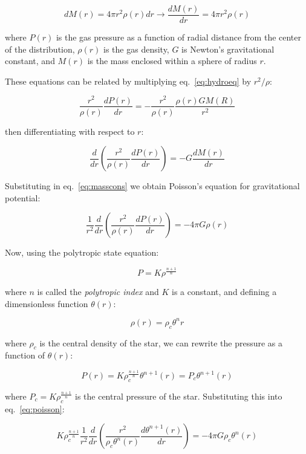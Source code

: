 \documentclass[twoside]{article}
\begin{document}
    \begin{equation}
    \label{eq:masscons}
    dM(r)=4\pi r^2\rho(r)dr \rightarrow \frac{dM(r)}{dr} = 4\pi r^2\rho(r)
    \end{equation}

where \(P(r)\) is the gas pressure as a function of radial distance from the
center of the distribution, \(\rho(r)\) is the gas density, \(G\) is Newton's
gravitational constant, and \(M(r)\) is the mass enclosed within a sphere of
radius \(r\).

These equations can be related by multiplying eq.~\ref{eq:hydroeq} by
\(r^2/\rho\):

\[ \frac{r^2}{\rho(r)}\frac{dP(r)}{dr} = -\frac{r^2}{\rho(r)}
\frac{\rho(r)GM(R)}{r^2} \]

then differentiating with respect to \(r\):
            
\[
\frac{d}{dr}\left(\frac{r^2}{\rho(r)}\frac{dP(r)}{dr}\right)=-G\frac{dM(r)}{dr}
\]

Substituting in eq.~\ref{eq:masscons} we obtain Poisson's equation for gravitational potential:

\begin{equation}
    \label{eq:poisson}
    \frac{1}{r^2} \frac{d}{dr} \left( \frac{r^2}{\rho(r)}\frac{dP(r)}{dr} \right) = -4 \pi G\rho(r)
\end{equation}

Now, using the polytropic state equation:

\begin{equation}
    \label{eq:polytropstate}
    P=K\rho^{\frac{n+1}{n}}
\end{equation}

where \(n\) is called the \textit{polytropic index} and \(K\) is a constant, and
defining a dimensionless function \(\theta(r)\):

\begin{equation}
    \label{eq:thetar}
    \rho(r)=\rho_c\theta^n{r}
\end{equation}

where \(\rho_c\) is the central density of the star, we can rewrite the pressure
as a function of \(\theta(r)\):

            \[
                P(r)=K\rho_c^{\frac{n+1}{n}}\theta^{n+1}(r)=P_c\theta^{n+1}(r)
            \]

            where \(P_c=K\rho_c^{\frac{n+1}{n}}\) is the central pressure of the
            star. Substituting this into eq.~\ref{eq:poisson}:

            \[
                K\rho_c^{\frac{n+1}{n}}\frac{1}{r^2}\frac{d}{dr}\left(\frac{r^2}{\rho_c\theta^n(r)}\frac{d\theta^{n+1}(r)}{dr}\right)=-4\pi
                G\rho_c\theta^n(r)
            \]
\end{document}
